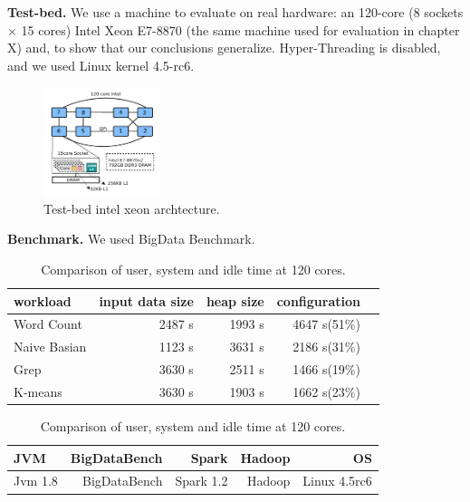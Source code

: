 \ifkor
\noindent
\textbf{Test-bed. }
We use a machine to evaluate on real hardware: an 120-core (8 sockets × 15
cores) Intel Xeon E7-8870 (the same machine used for evaluation in chapter X)
and, to show that our conclusions generalize.
Hyper-Threading is disabled, and we used Linux kernel 4.5-rc6.

\begin{figure}[h]
  \begin{center}
     \includegraphics[width=0.3\textwidth]{fig/xeon}
  \end{center}
  \caption{Test-bed intel xeon archtecture.}
  \label{fig:basic}
\end{figure}
\else

\fi

\noindent
\textbf{Benchmark.} We used BigData Benchmark.

\begin{table}[h!]
  \centering
  \small
  \begin{tabular}{l r r r r} \toprule
    workload & input data size & heap size & configuration \\
    \midrule
    Word Count & 2487 s & 1993 s & 4647 s(51\%)\\ 
    Naive Basian & 1123 s & 3631 s & 2186 s(31\%)\\
    Grep & 3630 s & 2511 s & 1466 s(19\%)\\
    K-means & 3630 s & 1903 s & 1662 s(23\%)\\
    \bottomrule
  \end{tabular}
  \begin{tabular}{l r r r r} \toprule
    JVM & BigDataBench & Spark & Hadoop & OS \\
    \midrule
    Jvm 1.8 & BigDataBench & Spark 1.2 & Hadoop & Linux 4.5rc6 \\ 
    \bottomrule
  \end{tabular}

  \caption{Comparison of user, system and idle time at 120 cores.}
  \label{tab:memuse}
\end{table}

